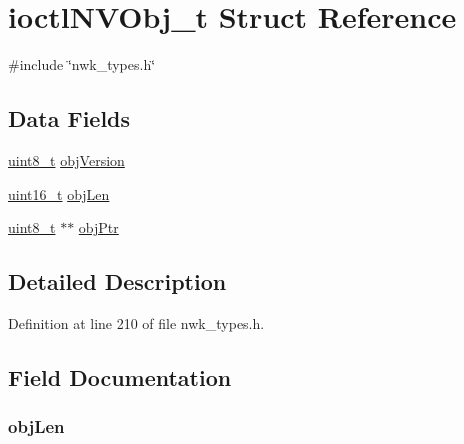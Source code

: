 \hypertarget{structioctlNVObj__t}{\section{ioctl\-N\-V\-Obj\-\_\-t \-Struct \-Reference}
\label{structioctlNVObj__t}
}


{\ttfamily \#include \char`\"{}nwk\-\_\-types.\-h\char`\"{}}

\subsection*{\-Data \-Fields}
\begin{DoxyCompactItemize}
\item 
\hyperlink{bsp__msp430__defs_8h_aba7bc1797add20fe3efdf37ced1182c5}{uint8\-\_\-t} \hyperlink{structioctlNVObj__t_a822a4cb6fbb3487cd295d0620a299c02}{obj\-Version}
\item 
\hyperlink{bsp__msp430__defs_8h_a273cf69d639a59973b6019625df33e30}{uint16\-\_\-t} \hyperlink{structioctlNVObj__t_a64023742b30768c5774963fbee0ac003}{obj\-Len}
\item 
\hyperlink{bsp__msp430__defs_8h_aba7bc1797add20fe3efdf37ced1182c5}{uint8\-\_\-t} $\ast$$\ast$ \hyperlink{structioctlNVObj__t_a949432122afe3e9a023a8ffb333e81d4}{obj\-Ptr}
\end{DoxyCompactItemize}


\subsection{\-Detailed \-Description}


\-Definition at line 210 of file nwk\-\_\-types.\-h.



\subsection{\-Field \-Documentation}
\hypertarget{structioctlNVObj__t_a64023742b30768c5774963fbee0ac003}{
\subsubsection[{obj\-Len}]{ {\bf obj\-Len}}}\label{structioctlNVObj__t_a64023742b30768c5774963fbee0ac003}



